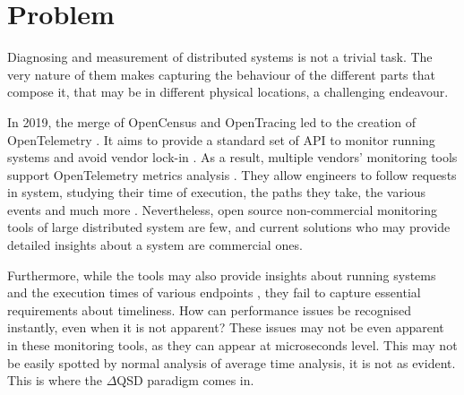 \section{Problem}
    Diagnosing and measurement of distributed systems is not a trivial task. The very nature of them makes capturing the behaviour of the different parts that compose it, that may be in different physical locations, a challenging endeavour. \cite{dist-m}

    In 2019, the merge of OpenCensus and OpenTracing led to the creation of OpenTelemetry \cite{openc}. It aims to provide a standard set of API to monitor running systems and avoid vendor lock-in \cite{otel-v}. As a result, multiple vendors' monitoring tools support OpenTelemetry metrics analysis \cite{otel-ven}. They allow engineers to follow requests in system, studying their time of execution, the paths they take, the various events and much more \cite{otel-t}. Nevertheless, open source non-commercial monitoring tools of large distributed system are few, and current solutions who may provide detailed insights about a system are commercial ones. \cite{otel-aw} 

    Furthermore, while the tools may also provide insights about running systems and the execution times of various endpoints \cite{jag-spm}, they fail to capture essential requirements about timeliness. How can performance issues be recognised instantly, even when it is not apparent? These issues may not be even apparent in these monitoring tools, as they can appear at microseconds level. This may not be easily spotted by normal analysis of average time analysis, it is not as evident. \\
    This is where the $\Delta$QSD paradigm comes in.



